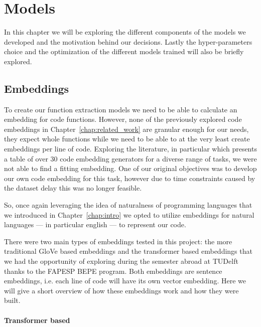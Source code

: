 

\chapter{Models}
\label{chap:models}

In this chapter we will be exploring the different components of the models we developed and the motivation behind our decisions. Lastly the hyper-parameters choice and the optimization of the different models trained  will also be briefly explored. 



\section{Embeddings}

To create our function extraction models we need to be able to calculate an embedding for code functions. However, none of the previously explored code embeddings in Chapter~\ref{chap:related_work} are granular enough for our needs, they expect whole functions while we need to be able to at the very least create embeddings per line of code. Exploring the literature, in particular \citet{allamanis2018survey} which presents a table of over 30 code embedding generators for a diverse range of tasks, we were not able to find a fitting embedding. One of our original objectives was to develop our own code embedding for this task, however due to time constraints caused by the dataset delay this was no longer feasible.



So, once again leveraging the idea of naturalness of programming languages that we introduced in Chapter~\ref{chap:intro} we opted to utilize embeddings for natural languages --- in particular english --- to represent our code.


There were two main types of embeddings tested in this project: the more traditional GloVe based embeddings and the transformer based embeddings that we had the opportunity of exploring during the semester abroad at TUDelft thanks to the FAPESP BEPE program. Both embeddings are sentence embeddings, i.e. each line of code will have its own vector embedding. Here we will give a short  overview of how these embeddings work and how they were built.



\subsubsection{Transformer based}


